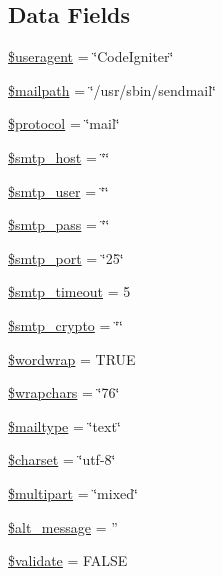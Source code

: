 \subsection*{Data Fields}
\begin{DoxyCompactItemize}
\item 
\hyperlink{class_c_i___email_adc6d59b7c0768eeffafe3b78c4836959}{\$useragent} = \char`\"{}Code\-Igniter\char`\"{}
\item 
\hyperlink{class_c_i___email_a23dd98b1852b9e73c20292b2cc96b20f}{\$mailpath} = \char`\"{}/usr/sbin/sendmail\char`\"{}
\item 
\hyperlink{class_c_i___email_ac01bf1cf041487498864d054b991f570}{\$protocol} = \char`\"{}mail\char`\"{}
\item 
\hyperlink{class_c_i___email_aa1ef5144d9ef39807b72f29299128eb1}{\$smtp\-\_\-host} = \char`\"{}\char`\"{}
\item 
\hyperlink{class_c_i___email_ac77010332fb55af4ed3ac38f0e39114d}{\$smtp\-\_\-user} = \char`\"{}\char`\"{}
\item 
\hyperlink{class_c_i___email_ae8b7daa14d7182bd564f04f752948400}{\$smtp\-\_\-pass} = \char`\"{}\char`\"{}
\item 
\hyperlink{class_c_i___email_af98a134522a65f513cff2718fc74968f}{\$smtp\-\_\-port} = \char`\"{}25\char`\"{}
\item 
\hyperlink{class_c_i___email_afd19e9cbfc82dd26a270fccd29e29728}{\$smtp\-\_\-timeout} = 5
\item 
\hyperlink{class_c_i___email_ab324ab40108bacab087e18556627ef1e}{\$smtp\-\_\-crypto} = \char`\"{}\char`\"{}
\item 
\hyperlink{class_c_i___email_abc150a71df67310da874f7399ab5f2cd}{\$wordwrap} = T\-R\-U\-E
\item 
\hyperlink{class_c_i___email_a8834e27a87a8b935ab1155d1d7bd44d2}{\$wrapchars} = \char`\"{}76\char`\"{}
\item 
\hyperlink{class_c_i___email_a7f4dd7af7642585306869f8985ab744f}{\$mailtype} = \char`\"{}text\char`\"{}
\item 
\hyperlink{class_c_i___email_af10158dd74b75f1d337e83102d6b82ce}{\$charset} = \char`\"{}utf-\/8\char`\"{}
\item 
\hyperlink{class_c_i___email_adc885f76d89c0c495bea0488f29c3104}{\$multipart} = \char`\"{}mixed\char`\"{}
\item 
\hyperlink{class_c_i___email_a266e7a7eb7cbcb0fc73a94b22a310a14}{\$alt\-\_\-message} = ''
\item 
\hyperlink{class_c_i___email_a320b75b46e1832c327d9d47b4cea9e7d}{\$validate} = F\-A\-L\-S\-E

\end{DoxyCompactItemize}
